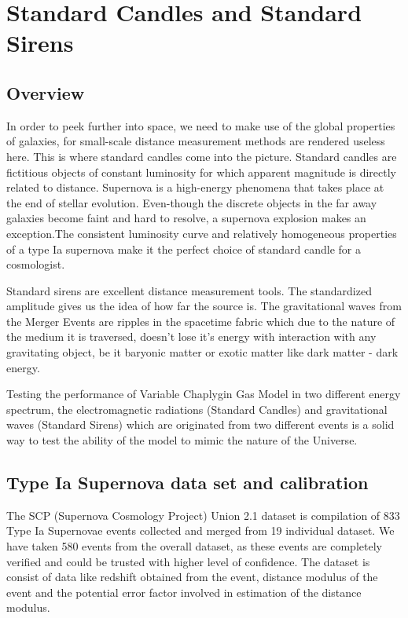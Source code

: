 \chapter{Standard Candles and Standard Sirens}
\label{sec:4} 
\section{Overview}
In order to peek further into space, we need to make use of the global properties of galaxies, for small-scale distance measurement methods are rendered useless here. This is where standard candles come into the picture. Standard candles are fictitious objects of constant luminosity for which apparent magnitude is directly related to distance. Supernova is a high-energy phenomena that takes place at the end of stellar evolution. Even-though the discrete objects in the far away galaxies become faint and hard to resolve, a supernova explosion makes an exception.The consistent luminosity curve and relatively homogeneous properties of a type Ia supernova make it the perfect choice of standard candle for a cosmologist. 

Standard sirens are excellent distance measurement tools. The standardized amplitude gives us the idea of how far the source is. The gravitational waves from the Merger Events are ripples in the spacetime fabric which due to the nature of the medium it is traversed, doesn't lose it's energy with interaction with any gravitating object, be it baryonic matter or exotic matter like dark matter - dark energy. 

Testing the performance of Variable Chaplygin Gas Model in two different energy spectrum, the electromagnetic radiations (Standard Candles) and gravitational waves (Standard Sirens) which are originated from two different events is a solid way to test the ability of the model to mimic the nature of the Universe. 
   
\section{Type Ia Supernova data set and calibration}
The SCP (Supernova Cosmology Project) Union 2.1 dataset is compilation of 833 Type Ia Supernovae events collected and merged from 19 individual dataset. We have taken 580 events from the overall dataset, as these events are completely verified and could be trusted with higher level of confidence. The dataset is consist of data like redshift obtained from the event, distance modulus of the event and the potential error factor involved in estimation of the distance modulus.

